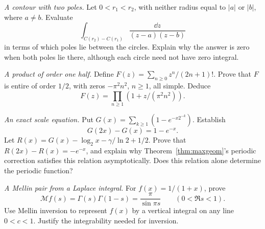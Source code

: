 \begin{exercise}[$\star$]\label{ex:v8c14a}
\emph{A contour with two poles.} Let $0<r_1<r_2$, with neither radius equal to $|a|$ or $|b|$, where $a\ne b$. Evaluate
\[\int_{C(r_2)-C(r_1)}\frac{\dd z}{(z-a)(z-b)}\]
in terms of which poles lie between the circles. Explain why the answer is zero when both poles lie there, although each circle need not have zero integral.
\end{exercise}
\begin{exercise}[$\star\star$]\label{ex:v8c14b}
\emph{A product of order one half.} Define $F(z)=\sum_{n\ge0}z^n/(2n+1)!$. Prove that $F$ is entire of order $1/2$, with zeros $-\pi^2n^2$, $n\ge1$, all simple. Deduce
\[F(z)=\prod_{n\ge1}(1+z/(\pi^2n^2)).\]
\end{exercise}
\begin{exercise}[$\star\star$]\label{ex:v8c14c}
\emph{An exact scale equation.} Put $G(x)=\sum_{k\ge1}(1-e^{-x2^{-k}})$. Establish
\[G(2x)-G(x)=1-e^{-x}.\]
Let $R(x)=G(x)-\log_2x-\gamma/\ln2+1/2$. Prove that $R(2x)-R(x)=-e^{-x}$, and explain why Theorem~\ref{thm:maxgeom}'s periodic correction satisfies this relation asymptotically. Does this relation alone determine the periodic function?
\end{exercise}
\begin{exercise}[$\star\star$]\label{ex:v8c14d}
\emph{A Mellin pair from a Laplace integral.} For $f(x)=1/(1+x)$, prove
\[\mathcal Mf(s)=\Gamma(s)\Gamma(1-s)=\frac\pi{\sin\pi s}\qquad(0<\Re s<1).
\]
Use Mellin inversion to represent $f(x)$ by a vertical integral on any line $0<c<1$. Justify the integrability needed for inversion.
\end{exercise}

